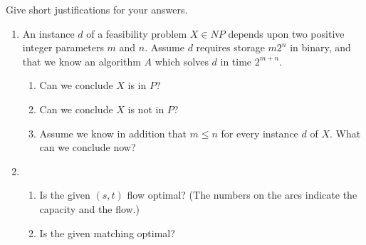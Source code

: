 \begin{enumerate}
     Give short justifications for your answers.
     \begin{enumerate}
       \item An instance $d$ of a feasibility problem $X \in NP$
         depends upon two positive integer parameters $m$ and $n$.
         Assume $d$ requires storage $m2^n$ in binary, and that we
         know an algorithm $A$ which solves $d$ in time $2^{m+n}$.
         \begin{enumerate}
           \item Can we conclude $X$ is in $P$?
             \vspace*{1in}
           \item Can we conclude $X$ is not in $P$?
             \vspace*{1in}
           \item Assume we know in addition that $m\leq n$ for every
             instance $d$ of $X$.  What can we conclude now?
             \vspace*{1in}
         \end{enumerate}
       \item
         \begin{enumerate}
           \item Is the given $(s,t)$ flow optimal? (The numbers on the
             arcs indicate the capacity and the flow.)
             \vspace*{1.8in}
           \item Is the given matching optimal?
         \end{enumerate}
     \end{enumerate}
\end{enumerate}


